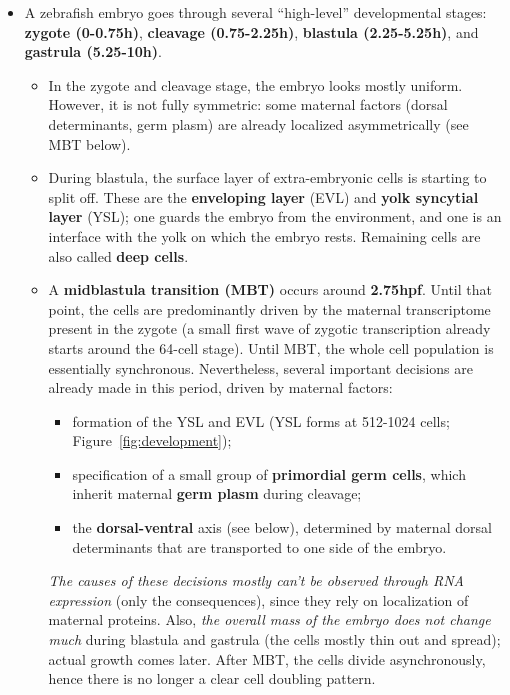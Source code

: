 \documentclass[11pt,a4paper]{article}
\begin{document}
\begin{itemize}
	\item A zebrafish embryo goes through several ``high-level'' developmental stages: \textbf{zygote (0-0.75h)}, \textbf{cleavage (0.75-2.25h)}, \textbf{blastula (2.25-5.25h)}, and \textbf{gastrula (5.25-10h)}.
	\begin{itemize}
		\item In the zygote and cleavage stage, the embryo looks mostly uniform. However, it is not fully symmetric: some maternal factors (dorsal determinants, germ plasm) are already localized asymmetrically (see MBT below).
		\item During blastula, the surface layer of extra-embryonic cells is starting to split off. These are the \textbf{enveloping layer} (EVL) and \textbf{yolk syncytial layer} (YSL); one guards the embryo from the environment, and one is an interface with the yolk on which the embryo rests. Remaining cells are also called \textbf{deep cells}.
		\item A \textbf{midblastula transition (MBT)} occurs around \textbf{2.75hpf}. Until that point, the cells are predominantly driven by the maternal transcriptome present in the zygote (a small first wave of zygotic transcription already starts around the 64-cell stage). Until MBT, the whole cell population is essentially synchronous. Nevertheless, several important decisions are already made in this period, driven by maternal factors:
		\begin{itemize}
			\item formation of the YSL and EVL (YSL forms at 512-1024 cells; Figure~\ref{fig:development});
			\item specification of a small group of \textbf{primordial germ cells}, which inherit maternal \textbf{germ plasm} during cleavage;
			\item the \textbf{dorsal-ventral} axis (see below), determined by maternal dorsal determinants that are transported to one side of the embryo.
		\end{itemize}
		\emph{The causes of these decisions mostly can't be observed through RNA expression} (only the consequences), since they rely on localization of maternal proteins. Also, \emph{the overall mass of the embryo does not change much} during blastula and gastrula (the cells mostly thin out and spread); actual growth comes later. After MBT, the cells divide asynchronously, hence there is no longer a clear cell doubling pattern.

\end{itemize}
\end{itemize}
\end{document}
